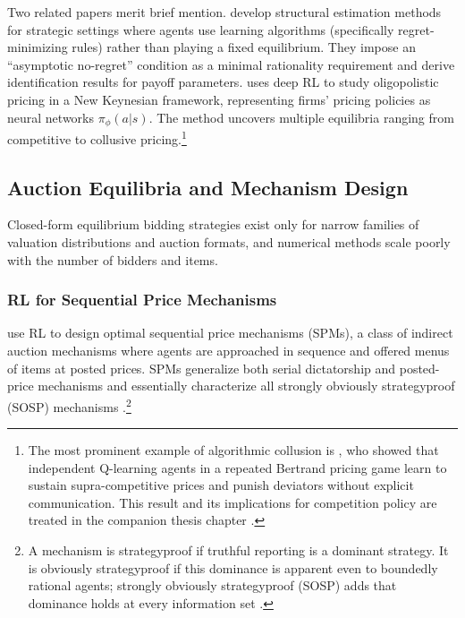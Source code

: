 Two related papers merit brief mention. \citet{LomysMagnolfi2024} develop structural estimation methods for strategic settings where agents use learning algorithms (specifically regret-minimizing rules) rather than playing a fixed equilibrium. They impose an ``asymptotic no-regret'' condition as a minimal rationality requirement and derive identification results for payoff parameters. \citet{Covarrubias2022} uses deep RL to study oligopolistic pricing in a New Keynesian framework, representing firms' pricing policies as neural networks $\pi_\phi(a|s)$. The method uncovers multiple equilibria ranging from competitive to collusive pricing.\footnote{The most prominent example of algorithmic collusion is \citet{Calvano2020}, who showed that independent Q-learning agents in a repeated Bertrand pricing game learn to sustain supra-competitive prices and punish deviators without explicit communication. This result and its implications for competition policy are treated in the companion thesis chapter \citep{Rawat2026collusion}.}


\subsection{Auction Equilibria and Mechanism Design}

Closed-form equilibrium bidding strategies exist only for narrow families of valuation distributions and auction formats, and numerical methods scale poorly with the number of bidders and items.


\subsubsection{RL for Sequential Price Mechanisms}

\citet{BreroEtAl2021} use RL to design optimal sequential price mechanisms (SPMs), a class of indirect auction mechanisms where agents are approached in sequence and offered menus of items at posted prices. SPMs generalize both serial dictatorship and posted-price mechanisms and essentially characterize all strongly obviously strategyproof (SOSP) mechanisms \citep{PyciaAndTroyan2019}.\footnote{A mechanism is strategyproof if truthful reporting is a dominant strategy. It is obviously strategyproof if this dominance is apparent even to boundedly rational agents; strongly obviously strategyproof (SOSP) adds that dominance holds at every information set \citep{PyciaAndTroyan2019}.}

